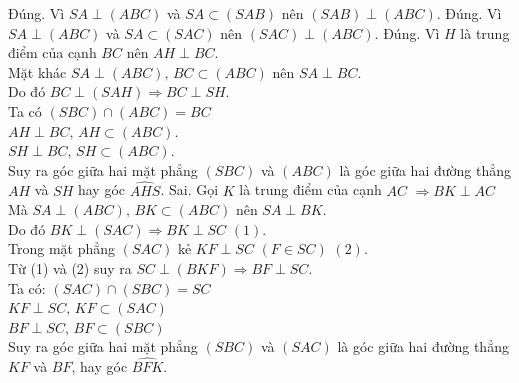 \begin{ex}
{\begin{center}
		\end{center}
		\begin{itemchoice}
			\itemch Đúng. Vì $SA \perp \left( ABC \right)$ và $SA\subset \left( SAB \right)$ nên $\left( SAB \right) \perp \left( ABC \right)$.
			\itemch Đúng. Vì $SA \perp \left( ABC \right)$ và $SA\subset \left( SAC \right)$ nên $\left( SAC \right) \perp \left( ABC \right)$.
			\itemch Đúng. Vì $H$ là trung điểm của cạnh $BC$ nên $AH \perp BC$.\\
			Mặt khác $SA \perp \left( ABC \right), \,BC\subset \left( ABC \right)$ nên $SA \perp BC$.\\
			Do đó $BC \perp \left( SAH \right)\Rightarrow BC \perp SH$.\\
			Ta có $\left( SBC \right)\cap \left( ABC \right)=BC$\\
			$AH\perp BC,\,AH\subset \left( ABC \right)$.\\
			$SH\perp BC,\,SH\subset \left( ABC \right)$.\\
			Suy ra góc giữa hai mặt phẳng $\left( SBC \right)$ và $\left( ABC \right)$ là góc giữa hai đường thẳng $AH$ và $SH$ hay góc $\widehat{AHS}$.
			\itemch Sai. Gọi $K$ là trung điểm của cạnh $AC$ $\Rightarrow BK \perp AC$\\
			Mà $SA \perp \left( ABC \right),\,BK\subset \left( ABC \right)$ nên $SA \perp BK$.\\
			Do đó $BK\perp \left( SAC \right)\Rightarrow BK \perp SC\,\,\left( 1 \right)$.\\
			Trong mặt phẳng $\left( SAC \right)$ kẻ $KF \perp SC\,\,\left( F\in SC \right)\,\,\left( 2 \right)$.\\
			Từ (1) và (2) suy ra $SC\perp \left( BKF \right)\Rightarrow BF\perp SC$.\\
			Ta có: $\left( SAC \right)\cap \left( SBC \right)=SC$\\
			$KF\perp SC,\,KF\subset \left( SAC \right)$\\
			$BF\perp SC,\,BF\subset \left( SBC \right)$\\
			Suy ra góc giữa hai mặt phẳng $\left( SBC \right)$ và $\left( SAC \right)$ là góc giữa hai đường thẳng $KF$ và $BF$, hay góc $\widehat{BFK}$.
		\end{itemchoice}
	}
\end{ex}
